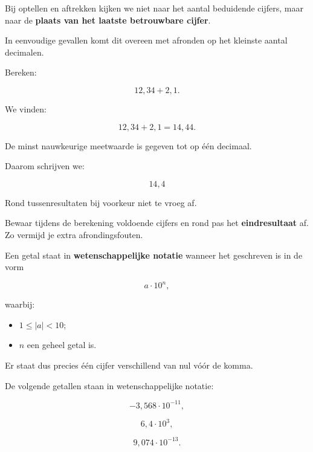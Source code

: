 \documentclass{ximera}
\begin{document}

Bij optellen en aftrekken kijken we niet naar het aantal beduidende cijfers,
maar naar de \textbf{plaats van het laatste betrouwbare cijfer}.

In eenvoudige gevallen komt dit overeen met afronden op het kleinste aantal
decimalen.

\begin{voorbeeld}

Bereken:

\[
12{,}34 + 2{,}1.
\]

We vinden:

\[
12{,}34 + 2{,}1 = 14{,}44.
\]

De minst nauwkeurige meetwaarde is gegeven tot op één decimaal.

Daarom schrijven we:

\[
\boxed{14{,}4}
\]

\end{voorbeeld}


\begin{opmerking}
Rond tussenresultaten bij voorkeur niet te vroeg af.

Bewaar tijdens de berekening voldoende cijfers en rond pas het
\textbf{eindresultaat} af. Zo vermijd je extra afrondingsfouten.
\end{opmerking}




\begin{definitie}
Een getal staat in \textbf{wetenschappelijke notatie} wanneer het geschreven is
in de vorm

\[
a \cdot 10^n,
\]

waarbij:

\begin{itemize}
    \item $1 \leq |a| < 10$;
    \item $n$ een geheel getal is.
\end{itemize}

Er staat dus precies één cijfer verschillend van nul vóór de komma.
\end{definitie}


\begin{voorbeeld}

De volgende getallen staan in wetenschappelijke notatie:

\[
-3{,}568 \cdot 10^{-11},
\]

\[
6{,}4 \cdot 10^3,
\]

\[
9{,}074 \cdot 10^{-13}.
\]

\end{voorbeeld}
\end{document}
